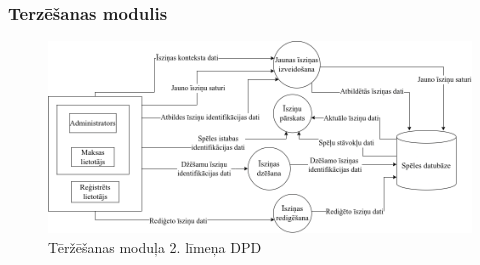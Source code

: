 \clearpage
\subsubsection{Terzēšanas modulis}

\begin{figure}[htbp]
	\centering
	\includegraphics[width=\linewidth]{./src/img/TerzēšanasModulis.png}
	\caption{Tēržēšanas moduļa 2. līmeņa DPD}
	\label{fig:dpd-2-chat}
\end{figure}





